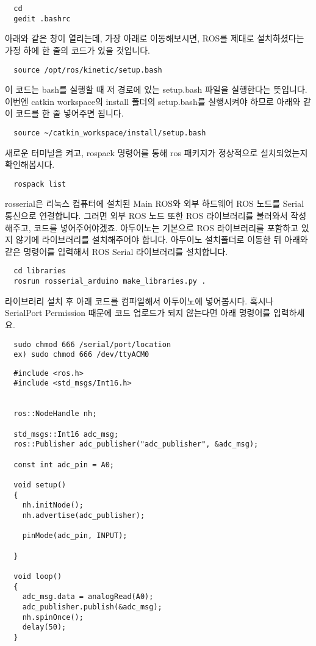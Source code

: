 \documentclass[11pt,fleqn]{book} %
\begin{document}
\begin{verbatim}
  cd
  gedit .bashrc
\end{verbatim}

아래와 같은 창이 열리는데, 가장 아래로 이동해보시면, ROS를 제대로 설치하셨다는 가정 하에 한 줄의 코드가 있을 것입니다.

\begin{verbatim}
  source /opt/ros/kinetic/setup.bash
\end{verbatim}

이 코드는 bash를 실행할 때 저 경로에 있는 setup.bash 파일을 실행한다는 뜻입니다.
이번엔 catkin workspace의 install 폴더의 setup.bash를 실행시켜야 하므로 아래와 같이 코드를 한 줄 넣어주면 됩니다.

\begin{verbatim}
  source ~/catkin_workspace/install/setup.bash
\end{verbatim}

새로운 터미널을 켜고, rospack 명령어를 통해 ros 패키지가 정상적으로 설치되었는지 확인해봅시다.

\begin{verbatim}
  rospack list
\end{verbatim}

rosserial은 리눅스 컴퓨터에 설치된 Main ROS와 외부 하드웨어 ROS 노드를 Serial 통신으로 연결합니다.
그러면 외부 ROS 노드 또한 ROS 라이브러리를 불러와서 작성해주고, 코드를 넣어주어야겠죠. 아두이노는 기본으로
ROS 라이브러리를 포함하고 있지 않기에 라이브러리를 설치해주어야 합니다.
아두이노 설치폴더로 이동한 뒤 아래와 같은 명령어를 입력해서 ROS Serial 라이브러리를 설치합니다.

\begin{verbatim}
  cd libraries
  rosrun rosserial_arduino make_libraries.py .
\end{verbatim}

라이브러리 설치 후 아래 코드를 컴파일해서 아두이노에 넣어봅시다. 혹시나 SerialPort Permission 때문에 코드 업로드가 되지 않는다면 아래 명령어를 입력하세요.

\begin{verbatim}
  sudo chmod 666 /serial/port/location
  ex) sudo chmod 666 /dev/ttyACM0
\end{verbatim}

\begin{verbatim}
  #include <ros.h>
  #include <std_msgs/Int16.h>


  ros::NodeHandle nh;

  std_msgs::Int16 adc_msg;
  ros::Publisher adc_publisher("adc_publisher", &adc_msg);

  const int adc_pin = A0;

  void setup()
  {
    nh.initNode();
    nh.advertise(adc_publisher);

    pinMode(adc_pin, INPUT);

  }

  void loop()
  {
    adc_msg.data = analogRead(A0);
    adc_publisher.publish(&adc_msg);
    nh.spinOnce();
    delay(50);
  }
\end{verbatim}
\end{document}
